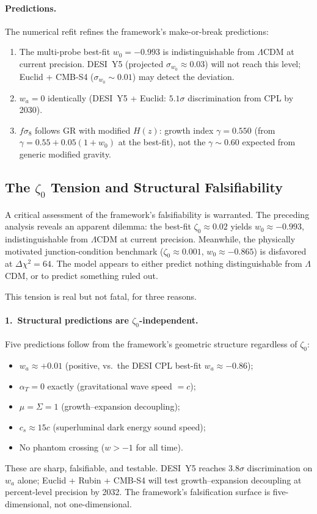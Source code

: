 \paragraph{Predictions.} The numerical refit refines the framework's make-or-break predictions:
\begin{enumerate}
\item The multi-probe best-fit $w_0 = -0.993$ is indistinguishable from $\Lambda$CDM at current precision. DESI~Y5 (projected $\sigma_{w_0} \approx 0.03$) will not reach this level; Euclid + CMB-S4 ($\sigma_{w_0} \sim 0.01$) may detect the deviation.
\item $w_a = 0$ identically (DESI~Y5 + Euclid: $5.1\sigma$ discrimination from CPL by 2030).
\item $f\sigma_8$ follows GR with modified $H(z)$: growth index $\gamma = 0.550$ (from $\gamma = 0.55 + 0.05(1+w_0)$ at the best-fit), not the $\gamma \sim 0.60$ expected from generic modified gravity.
\end{enumerate}

\subsection{The $\zeta_0$ Tension and Structural Falsifiability}
\label{sec:2-zeta0-tension}

A critical assessment of the framework's falsifiability is warranted. The preceding analysis reveals an apparent dilemma: the best-fit $\zeta_0 \approx 0.02$ yields $w_0 \approx -0.993$, indistinguishable from $\Lambda$CDM at current precision. Meanwhile, the physically motivated junction-condition benchmark ($\zeta_0 \approx 0.001$, $w_0 \approx -0.865$) is disfavored at $\Delta\chi^2 = 64$. The model appears to either predict nothing distinguishable from $\Lambda$CDM, or to predict something ruled out.

This tension is real but not fatal, for three reasons.

\paragraph{1.\ Structural predictions are $\zeta_0$-independent.} Five predictions follow from the framework's geometric structure regardless of $\zeta_0$:
\begin{itemize}
\item $w_a \approx +0.01$ (positive, vs.\ the DESI CPL best-fit $w_a \approx -0.86$);
\item $\alpha_T = 0$ exactly (gravitational wave speed $= c$);
\item $\mu = \Sigma = 1$ (growth--expansion decoupling);
\item $c_s \approx 15c$ (superluminal dark energy sound speed);
\item No phantom crossing ($w > -1$ for all time).
\end{itemize}
These are sharp, falsifiable, and testable. DESI~Y5 reaches $3.8\sigma$ discrimination on $w_a$ alone; Euclid + Rubin + CMB-S4 will test growth--expansion decoupling at percent-level precision by 2032. The framework's falsification surface is five-dimensional, not one-dimensional.

